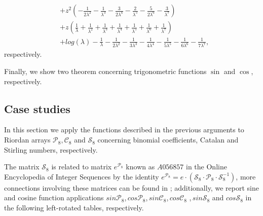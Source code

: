 \begin{remark}
\begin{displaymath}
\begin{split}
&+ z^{2} \left(- \frac{1}{2 \lambda^{2}} - \frac{1}{\lambda^{3}} - \frac{3}{2 \lambda^{4}} - \frac{2}{\lambda^{5}} - \frac{5}{2 \lambda^{6}} - \frac{3}{\lambda^{7}}\right) \\
&+ z \left(\frac{1}{\lambda} + \frac{1}{\lambda^{2}} + \frac{1}{\lambda^{3}} + \frac{1}{\lambda^{4}} + \frac{1}{\lambda^{5}} + \frac{1}{\lambda^{6}} + \frac{1}{\lambda^{7}}\right) \\
&+ log{\left (\lambda \right )} - \frac{1}{\lambda} - \frac{1}{2 \lambda^{2}} - \frac{1}{3 \lambda^{3}} - \frac{1}{4 \lambda^{4}} - \frac{1}{5 \lambda^{5}} - \frac{1}{6 \lambda^{6}} - \frac{1}{7 \lambda^{7}},
\end{split}
\end{displaymath}
respectively.
\end{remark}

Finally, we show two theorem concerning trigonometric functions $\sin$ and
$\cos$, respectively.







\subsection{Case studies}

In this section we apply the functions described in the previous arguments to
Riordan arrays $\mathcal{P}_{8}, \mathcal{C}_{8}$ and $\mathcal{S}_{8}$
concerning binomial coefficients, Catalan and Stirling numbers, respectively.









The matrix $\mathcal{S}_{8}$ is related to matrix $e^{\mathcal{P}_{8}}$ known as
$A056857$ in the Online Encyclopedia of Integer Sequences \citep{OEIS} by the
identity $ e^{\mathcal{P}_{8}}=e\cdot\left(\mathcal{S}_{8}\cdot
\mathcal{P}_{8}\cdot \mathcal{S}_{8}^{-1}\right)$, more connections
involving these matrices can be found in \citep{CHEON200149}; additionally, we report
sine and cosine function applications 
$sin{\mathcal{P}_{8}}$,\,$cos{\mathcal{P}_{8}}$,\,$sin{\mathcal{C}_{8}}$,\,$cos{\mathcal{C}_{8}}$
,\,$sin{\mathcal{S}_{8}}$ and $cos{\mathcal{S}_{8}}$
in the following left-rotated tables, respectively.

